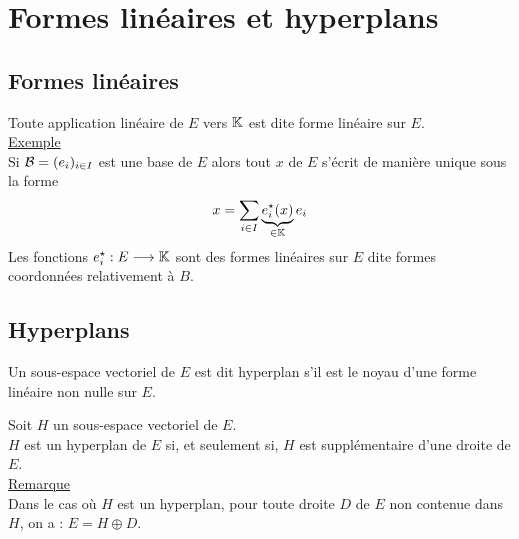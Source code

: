 \section{Formes linéaires et hyperplans}
\subsection{Formes linéaires}
\begin{defprop}
    Toute application linéaire de \(E\) vers \(\K\) est dite forme linéaire sur \(E\).\\
    \underline{Exemple}\\
    Si \(\cal{B} = (e_i)_{i\in I}\) est une base de \(E\) alors tout \(x\) de \(E\) s’écrit de manière unique sous la forme
    \[x = \sum_{i\in I}\underbrace{e^{\star}_i (x)}_{\in \K} e_i\]
    Les fonctions \(e^{\star}_i : E \to \K\) sont des formes linéaires sur \(E\) dite formes coordonnées relativement à \(B\).
\end{defprop}
\subsection{Hyperplans}
\begin{defi}
    Un sous-espace vectoriel de \(E\) est dit hyperplan s’il est le noyau d’une forme linéaire non nulle sur \(E\).
\end{defi}

\begin{defprop}
    Soit \(H\) un sous-espace vectoriel de \(E\).\\
    \(H\) est un hyperplan de \(E\) si, et seulement si, \(H\) est supplémentaire d’une droite de \(E\).\\
    \underline{Remarque}\\
    Dans le cas où \(H\) est un hyperplan, pour toute droite \(D\) de \(E\) non contenue dans \(H\), on a : \(E = H \oplus D\).
\end{defprop}

